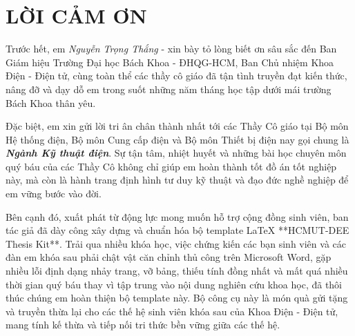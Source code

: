 
\chapter*{LỜI CẢM ƠN}

%

Trước hết, em \textit{Nguyễn Trọng Thắng} - xin bày tỏ lòng biết ơn sâu sắc đến Ban Giám hiệu Trường Đại học Bách Khoa - ĐHQG-HCM, Ban Chủ nhiệm Khoa Điện - Điện tử, cùng toàn thể các thầy cô giáo đã tận tình truyền đạt kiến thức, nâng đỡ và dạy dỗ em trong suốt những năm tháng học tập dưới mái trường Bách Khoa thân yêu.

Đặc biệt, em xin gửi lời tri ân chân thành nhất tới các Thầy Cô giáo tại Bộ môn Hệ thống điện, Bộ môn Cung cấp điện và Bộ môn Thiết bị điện nay gọi chung là \textit{\textbf{Ngành Kỹ thuật điện}}. Sự tận tâm, nhiệt huyết và những bài học chuyên môn quý báu của các Thầy Cô không chỉ giúp em hoàn thành tốt đồ án tốt nghiệp này, mà còn là hành trang định hình tư duy kỹ thuật và đạo đức nghề nghiệp để em vững bước vào đời.

Bên cạnh đó, xuất phát từ động lực mong muốn hỗ trợ cộng đồng sinh viên, ban tác giả đã dày công xây dựng và chuẩn hóa bộ template LaTeX **HCMUT-DEE Thesis Kit**. Trải qua nhiều khóa học, việc chứng kiến các bạn sinh viên và các đàn em khóa sau phải chật vật căn chỉnh thủ công trên Microsoft Word, gặp nhiều lỗi định dạng nhảy trang, vỡ bảng, thiếu tính đồng nhất và mất quá nhiều thời gian quý báu thay vì tập trung vào nội dung nghiên cứu khoa học, đã thôi thúc chúng em hoàn thiện bộ template này. Bộ công cụ này là món quà gửi tặng và truyền thừa lại cho các thế hệ sinh viên khóa sau của Khoa Điện - Điện tử, mang tính kế thừa và tiếp nối tri thức bền vững giữa các thế hệ.

